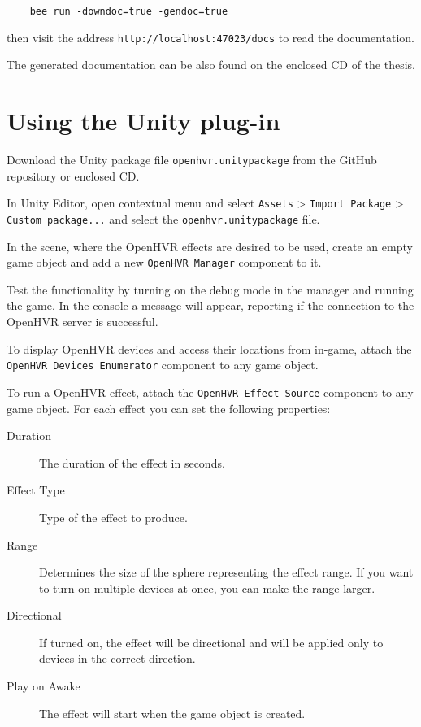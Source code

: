 \begin{verbatim}
    bee run -downdoc=true -gendoc=true
\end{verbatim}

then visit the address \verb|http://localhost:47023/docs| to read the
documentation.

The generated documentation can be also found on the enclosed CD of the thesis.

\section{Using the Unity plug-in}

Download the Unity package file \verb|openhvr.unitypackage| from the GitHub
repository or enclosed CD.

In Unity Editor, open contextual menu and select 
\verb|Assets| > \verb|Import Package| > \verb|Custom package...| and select
the \verb|openhvr.unitypackage| file.

In the scene, where the OpenHVR effects are desired to be used, create an empty
game object and add a new \verb|OpenHVR Manager| component to it.

Test the functionality by turning on the debug mode in the manager and running
the game. In the console a message will appear, reporting if the connection
to the OpenHVR server is successful.

To display OpenHVR devices and access their locations from in-game, attach
the \verb|OpenHVR Devices Enumerator| component to any game object.

To run a OpenHVR effect, attach the \verb|OpenHVR Effect Source| component to
any game object. For each effect you can set the following properties:

\begin{description}
    \item[Duration] The duration of the effect in seconds.
    \item[Effect Type] Type of the effect to produce.
    \item[Range] Determines the size of the sphere representing the effect range.
    If you want to turn on multiple devices at once, you can make the range larger.
    \item[Directional] If turned on, the effect will be directional and will
    be applied only to devices in the correct direction.
    \item[Play on Awake] The effect will start when the game object is created.
\end{description}


